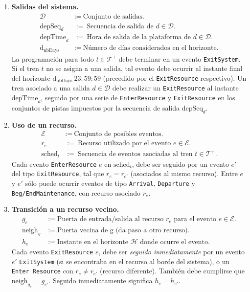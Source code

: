 \documentclass[letter, 10pt]{article}
\begin{document}
\begin{description}
\begin{enumerate}
        \item \textbf{Salidas del sistema.}
        \begin{align*}
            \mathcal{D} &:= \ \text{Conjunto de salidas.} \\
            \text{depSeq}_d &:= \ \text{Secuencia de salida de } d \in \mathcal{D}. \\
            \text{depTime}_d &:= \ \text{Hora de salida de la plataforma de } d \in \mathcal{D}. \\
            \text{d}_{\text{nbDays}} &:= \ \text{Número de días considerados en el horizonte.}
        \end{align*}
        La programación para todo $t \in \mathcal{T}^+$ debe terminar en un evento \texttt{ExitSystem}. Si el tren $t$ no se asigna a una salida, tal evento debe ocurrir al instante final del horizonte $\text{d}_{\text{nbDays}} \ 23:59:59$ (precedido por el \texttt{ExitResource} respectivo). Un tren asociado a una salida $d \in \mathcal{D}$ debe realizar un \texttt{ExitResource} al instante $\text{depTime}_d$, seguido por una serie de \texttt{EnterResource} y \texttt{ExitResource} en los conjuntos de pistas impuestos por la secuencia de salida $\text{depSeq}_d$.

        \item \textbf{Uso de un recurso.}
        \begin{align*}
            \mathcal{E} &:= \ \text{Conjunto de posibles eventos.} \\
            r_e &:= \ \text{Recurso utilizado por el evento } e \in \mathcal{E}. \\
            \text{sched}_t &:= \ \text{Secuencia de eventos asociadas al tren } t \in \mathcal{T}^+.
        \end{align*}
        Cada evento \texttt{EnterResource} $e$ en $\text{sched}_t$, debe ser seguido por un evento $e'$ del tipo \texttt{ExitResource}, tal que $r_e = r_{e'}$ (asociados al mismo recurso). Entre $e$ y $e'$ sólo puede ocurrir eventos de tipo \texttt{Arrival}, \texttt{Departure} y \texttt{Beg/EndMaintenance}, con recurso asociado $r_e$.


        \item \textbf{Transición a un recurso vecino.}
        \begin{align*}
            g_e &:= \text{Puerta de entrada/salida al recurso } r_e \text{ para el evento } e \in \mathcal{E}. \\
            \text{neigh}_g &:= \text{Puerta vecina de g (da paso a otro recurso)}. \\
            h_e &:= \text{Instante en el horizonte } \mathcal{H} \text{ donde ocurre el evento.}
        \end{align*}
        Cada evento \texttt{ExitResource} $e$, debe ser \textit{seguido inmediatamente} por un evento $e'$ \texttt{ExitSystem} (si se encontraba en el recurso al borde del sistema), o un \texttt{Enter Resource} con $r_e \neq r_{e'}$ (recurso diferente). También debe cumplirse que $\text{neigh}_{g_e} = g_{e'}$. Seguido inmediatamente significa $h_e = h_{e'}$.


\end{enumerate}
\end{description}
\end{document}
